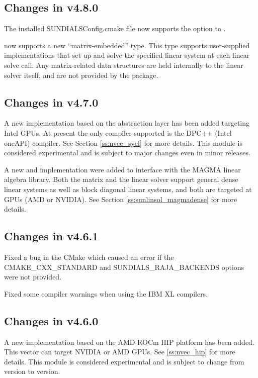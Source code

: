\subsection*{Changes in v4.8.0}

The installed SUNDIALSConfig.cmake file now supports the  option
to .

{\idas} now supports a new ``matrix-embedded'' {\sunlinsol} type.  This type
supports user-supplied {\sunlinsol} implementations that set up and solve the
specified linear system at each linear solve call.  Any matrix-related data
structures are held internally to the linear solver itself, and are not
provided by the {\sundials} package.

\subsection*{Changes in v4.7.0}

A new {\nvector} implementation based on the {\sycl} abstraction layer has been
added targeting Intel GPUs. At present the only {\sycl} compiler supported is
the DPC++ (Intel oneAPI) compiler. See Section \ref{ss:nvec_sycl} for more
details. This module is considered experimental and is subject to major changes
even in minor releases.

A new {\sunmatrix} and {\sunlinsol} implementation were added to interface
with the MAGMA linear algebra library. Both the matrix and the linear solver
support general dense linear systems as well as block diagonal linear systems,
and both are targeted at GPUs (AMD or NVIDIA). See Section \ref{ss:sunlinsol_magmadense}
for more details.

\subsection*{Changes in v4.6.1}

Fixed a bug in the {\sundials} CMake which caused an error
if the CMAKE\_CXX\_STANDARD and SUNDIALS\_RAJA\_BACKENDS options
were not provided.

Fixed some compiler warnings when using the IBM XL compilers.

\subsection*{Changes in v4.6.0}

A new {\nvector} implementation based on the AMD ROCm HIP platform has been
added. This vector can target NVIDIA or AMD GPUs. See \ref{ss:nvec_hip} for more
details. This module is considered experimental and is subject to change from
version to version.

